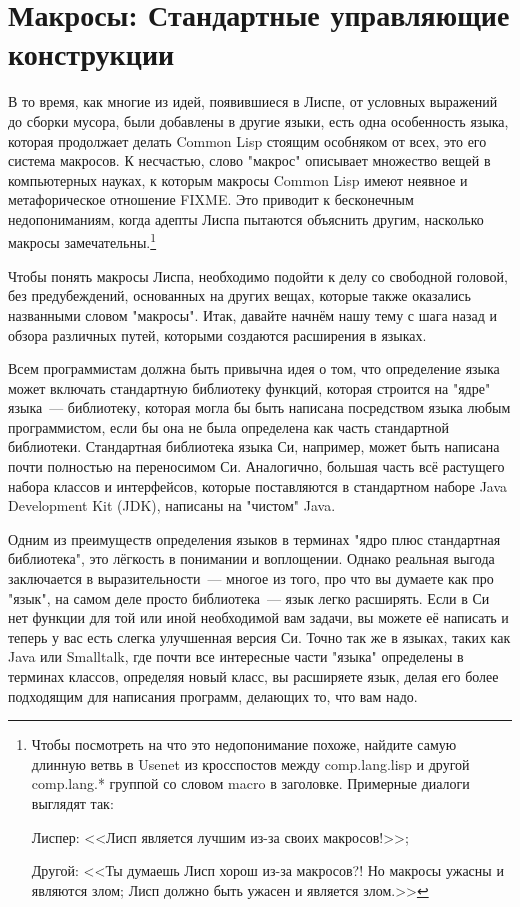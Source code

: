 \chapter{Макросы: Стандартные управляющие конструкции}
\label{ch:07}

В то время, как многие из идей, появившиеся в Лиспе, от условных выражений до сборки
мусора, были добавлены в другие языки, есть одна особенность языка, которая продолжает
делать Common Lisp стоящим особняком от всех, это его система макросов. К несчастью, слово
"макрос" описывает множество вещей в компьютерных науках, к которым макросы Common Lisp
имеют неявное и метафорическое отношение FIXME. Это приводит к бесконечным недопониманиям,
когда адепты Лиспа пытаются объяснить другим, насколько макросы
замечательны.\footnote{Чтобы посмотреть на что это недопонимание похоже, найдите самую
  длинную ветвь в Usenet из кросспостов между comp.lang.lisp и другой comp.lang.* группой
  со словом macro в заголовке. Примерные диалоги выглядят так:

Лиспер: <<Лисп является лучшим из-за своих макросов!>>;

Другой: <<Ты думаешь Лисп хорош из-за макросов?! Но макросы ужасны и являются злом; Лисп
должно быть ужасен и является злом.>>}

Чтобы понять макросы Лиспа, необходимо подойти к делу со свободной головой, без
предубеждений, основанных на других вещах, которые также оказались названными словом
"макросы". Итак, давайте начнём нашу тему с шага назад и обзора различных путей, которыми
создаются расширения в языках.

Всем программистам должна быть привычна идея о том, что определение языка может включать
стандартную библиотеку функций, которая строится на "ядре" языка~--- библиотеку, которая
могла бы быть написана посредством языка любым программистом, если бы она не была
определена как часть стандартной библиотеки. Стандартная библиотека языка Си, например,
может быть написана почти полностью на переносимом Си. Аналогично, большая часть всё
растущего набора классов и интерфейсов, которые поставляются в стандартном наборе Java
Development Kit (JDK), написаны на "чистом" Java.

Одним из преимуществ определения языков в терминах "ядро плюс стандартная библиотека", это
лёгкость в понимании и воплощении. Однако реальная выгода заключается в выразительности~---
многое из того, про что вы думаете как про "язык", на самом деле просто библиотека~--- язык
легко расширять. Если в Си нет функции для той или иной необходимой вам задачи, вы можете
её написать и теперь у вас есть слегка улучшенная версия Си. Точно так же в языках, таких
как Java или Smalltalk, где почти все интересные части "языка" определены в терминах
классов, определяя новый класс, вы расширяете язык, делая его более подходящим для
написания программ, делающих то, что вам надо.

